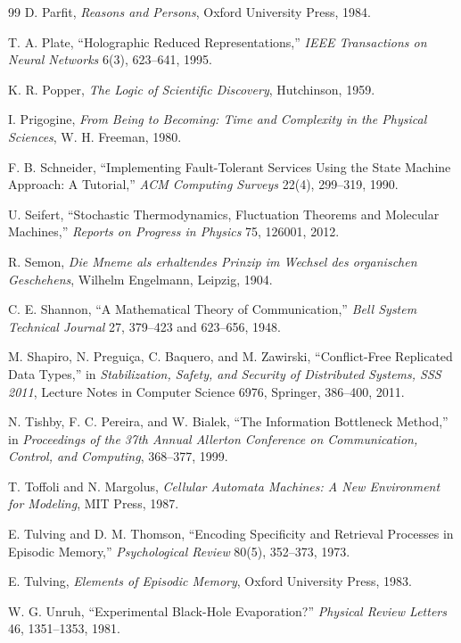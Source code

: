 \documentclass[11pt,twoside,openright]{book}
\theoremstyle{plain}
\theoremstyle{definition}
\theoremstyle{remark}
\begin{document}
\begin{thebibliography}{99}
 D. Parfit, \emph{Reasons and Persons}, Oxford University Press, 1984.

 T. A. Plate, ``Holographic Reduced Representations,'' \emph{IEEE Transactions on Neural Networks} 6(3), 623--641, 1995.

 K. R. Popper, \emph{The Logic of Scientific Discovery}, Hutchinson, 1959.

 I. Prigogine, \emph{From Being to Becoming: Time and Complexity in the Physical Sciences}, W. H. Freeman, 1980.

 F. B. Schneider, ``Implementing Fault-Tolerant Services Using the State Machine Approach: A Tutorial,'' \emph{ACM Computing Surveys} 22(4), 299--319, 1990.

 U. Seifert, ``Stochastic Thermodynamics, Fluctuation Theorems and Molecular Machines,'' \emph{Reports on Progress in Physics} 75, 126001, 2012.

 R. Semon, \emph{Die Mneme als erhaltendes Prinzip im Wechsel des organischen Geschehens}, Wilhelm Engelmann, Leipzig, 1904.

 C. E. Shannon, ``A Mathematical Theory of Communication,'' \emph{Bell System Technical Journal} 27, 379--423 and 623--656, 1948.

 M. Shapiro, N. Pregui\c{c}a, C. Baquero, and M. Zawirski, ``Conflict-Free Replicated Data Types,'' in \emph{Stabilization, Safety, and Security of Distributed Systems, SSS 2011}, Lecture Notes in Computer Science 6976, Springer, 386--400, 2011.

 N. Tishby, F. C. Pereira, and W. Bialek, ``The Information Bottleneck Method,'' in \emph{Proceedings of the 37th Annual Allerton Conference on Communication, Control, and Computing}, 368--377, 1999.

 T. Toffoli and N. Margolus, \emph{Cellular Automata Machines: A New Environment for Modeling}, MIT Press, 1987.

 E. Tulving and D. M. Thomson, ``Encoding Specificity and Retrieval Processes in Episodic Memory,'' \emph{Psychological Review} 80(5), 352--373, 1973.

 E. Tulving, \emph{Elements of Episodic Memory}, Oxford University Press, 1983.

 W. G. Unruh, ``Experimental Black-Hole Evaporation?'' \emph{Physical Review Letters} 46, 1351--1353, 1981.


\end{thebibliography}
\end{document}
